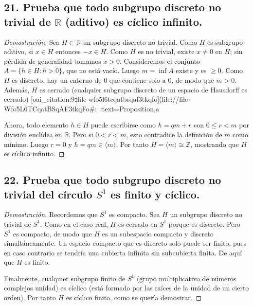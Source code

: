 \documentclass{article}
\begin{document}
\subsection*{21. Prueba que todo subgrupo discreto no trivial de $\mathbb{R}$ (aditivo) es cíclico infinito.}

\begin{proof}[Demostración]
Sea $H\subset\mathbb{R}$ un subgrupo discreto no trivial. Como $H$ es subgrupo aditivo, si $x\in H$ entonces $-x\in H$. Como $H$ es no trivial, existe $x\neq0$ en $H$; sin pérdida de generalidad tomamos $x>0$. Consideremos el conjunto $A=\{h\in H: h>0\}$, que no está vacío. Luego $m=\inf A$ existe y es $\ge0$. Como $H$ es discreto, hay un entorno de $0$ que contiene solo a $0$, de modo que $m>0$. Además, $H$ es cerrado (cualquier subgrupo discreto de un espacio de Hausdorff es cerrado) [oai_citation:9‡file-wfo5l6tcqatbsqaf3tkqfo](file://file-Wfo5L6TCqatBSqAF3tkqFo#:~:text=Proposition,a%

Ahora, todo elemento $h\in H$ puede escribirse como $h=qm+r$ con $0\le r<m$ por división euclídea en $\mathbb{R}$. Pero si $0<r<m$, esto contradice la definición de $m$ como mínimo. Luego $r=0$ y $h=qm\in \langle m\rangle$. Por tanto $H=\langle m\rangle\cong\mathbb{Z}$, mostrando que $H$ es cíclico infinito. 
\end{proof}

\subsection*{22. Prueba que todo subgrupo discreto no trivial del círculo $S^1$ es finito y cíclico.}

\begin{proof}[Demostración]
Recordemos que $S^1$ es compacto. Sea $H$ un subgrupo discreto no trivial de $S^1$. Como en el caso real, $H$ es cerrado en $S^1$ porque es discreto. Pero $S^1$ es compacto, de modo que $H$ es un subespacio compacto y discreto simultáneamente. Un espacio compacto que es discreto solo puede ser finito, pues en caso contrario se tendría una cubierta infinita sin subcubierta finita. De aquí que $H$ es finito. 

Finalmente, cualquier subgrupo finito de $S^1$ (grupo multiplicativo de números complejos unidad) es cíclico (está formado por las raíces de la unidad de un cierto orden). Por tanto $H$ es cíclico finito, como se quería demostrar. 
\end{proof}
\end{document}
